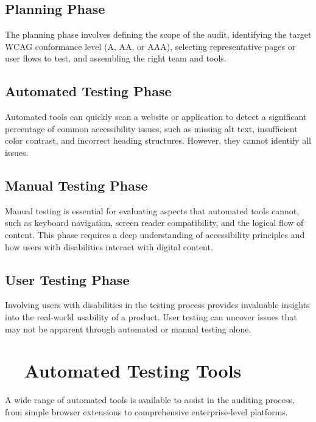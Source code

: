 \subsection{Planning Phase}
\label{subsec:planning-phase}
The planning phase involves defining the scope of the audit, identifying the target WCAG conformance level (A, AA, or AAA), selecting representative pages or user flows to test, and assembling the right team and tools.

\subsection{Automated Testing Phase}
\label{subsec:automated-testing-phase}
Automated tools can quickly scan a website or application to detect a significant percentage of common accessibility issues, such as missing alt text, insufficient color contrast, and incorrect heading structures. However, they cannot identify all issues.

\subsection{Manual Testing Phase}
\label{subsec:manual-testing-phase}
Manual testing is essential for evaluating aspects that automated tools cannot, such as keyboard navigation, screen reader compatibility, and the logical flow of content. This phase requires a deep understanding of accessibility principles and how users with disabilities interact with digital content.

\subsection{User Testing Phase}
\label{subsec:user-testing-phase}
Involving users with disabilities in the testing process provides invaluable insights into the real-world usability of a product. User testing can uncover issues that may not be apparent through automated or manual testing alone.
\supercite{Petrie2006}

\section{~~Automated Testing Tools}
\label{sec:automated-tools}
A wide range of automated tools is available to assist in the auditing process, from simple browser extensions to comprehensive enterprise-level platforms.

